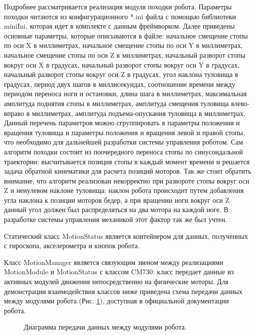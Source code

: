 Подробнее рассматривается реализация модуля походки робота. Параметры походки читаются из конфигурационного *.ini файла с помощью библиотеки miniIni, которая идет в комплекте с данным фреймворком. Далее приведены основные параметры, которые описываются в файле: начальное смещение стопы по оси X в миллиметрах, начальное смещение стопы по оси Y в миллиметрах, начальное смещение стопы по оси Z в миллиметрах, начальный разворот стопы вокруг оси X в градусах, начальный разворот стопы вокруг оси Y в градусах, начальный разворот стопы вокруг оси Z в градусах, угол наклона туловища в градусах, период двух шагов в миллисекундах, соотношение времени между периодом переноса ноги и остановки, длина шага в миллиметрах, максимальная амплитуда поднятия стопы в миллиметрах, амплитуда смещения туловища влево-вправо в миллиметрах, амплитуда подъема-опускания туловища в миллиметрах. Данный перечень параметров можно сгруппировать в параметры положения и вращения туловища и параметры положения и вращения левой и правой стопы, что необходимо для дальнейшей разработки системы управления роботом. Сам алгоритм походки состоит из поочередного переноса стопы по синусоидальной траектории: высчитывается позиция стопы в каждый момент времени и решается задача обратной кинематики для расчета позиций моторов. Так же стоит обратить внимание, что алгоритм реализован некорректно при развороте стопы вокруг оси Z и ненулевом наклоне туловища: наклон робота происходит путем добавления угла наклона к позиции моторов бедер, а при вращении ноги вокруг оси Z данный угол должен был распределяться на два мотора на каждой ноге. В разработке системы управления механикой этот фактор так же был учтен.

Статический класс MotionStatus является контейнером для данных, полученных с гироскопа, акселерометра и кнопок робота.

Класс MotionManager является связующим звеном между реализациями MotionModule и MotionStatus с классом CM730: класс передает данные из активных модулей движения непосредственно на физические моторы.
Для демонстрации взаимодействия классов ниже приведена схема передачи данных между модулями робота (Рис. \ref{im:1_framework_pipeline}), доступная в официальной документации робота\cite{urldarwinopemanual}.

\begin{figure}[h]
\caption{Диаграмма передачи данных между модулями робота.}
\label{im:1_framework_pipeline}
\end{figure}

